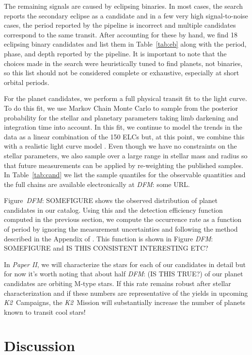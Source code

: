 \documentclass[12pt,preprint]{aastex}
\newcommand{\project}[1]{\textsl{#1}} %
\newcommand{\KT}{\project{K2}}
\newcommand{\papertwo}{\textsl{Paper II}}
\newcommand{\Tab}[1]{Table~\ref{tab:#1}}
\newcommand{\tab}[1]{\Tab{#1}}
\newcommand{\todo}[3]{{\color{#2}\emph{#1}: #3}}
\newcommand{\dfmtodo}[1]{\todo{DFM}{red}{#1}}
\begin{document}
The remaining signals are caused by eclipsing binaries.
In most cases, the search reports the secondary eclipse as a candidate and in
a few very high signal-to-noise cases, the period reported by the pipeline is
incorrect and multiple candidates correspond to the same transit.
After accounting for these by hand, we find 18 eclipsing binary candidates
and list them in \tab{eb} along with the period, phase, and depth reported by
the pipeline.
It is important to note that the choices made in the search were
heuristically tuned to find planets, not binaries, so this list should not be
considered complete or exhaustive, especially at short orbital periods.

For the planet candidates, we perform a full physical transit fit to the light
curve.
To do this fit, we use Markov Chain Monte Carlo \citep[MCMC;][]{emcee} to
sample from the posterior probability for the stellar and planetary
parameters taking limb darkening and integration time into account.
In this fit, we continue to model the trends in the data as a linear
combination of the 150 ELCs but, at this point, we combine this with a realistic
light curve model \citet{ma, kipping-ld}.
Even though we have no constraints on the stellar parameters, we also sample
over a large range in stellar mass and radius so that future measurements can
be applied by re-weighting the published samples.
In \tab{cand} we list the sample quantiles for the observable quantities and
the full chains are available electronically at \dfmtodo{some URL}.

Figure~\dfmtodo{SOMEFIGURE} shows the observed distribution of planet
candidates in our catalog.
Using this and the detection efficiency function computed in the previous
section, we compute the occurrence rate as a function of period by ignoring
the measurement uncertainties and following the method described in the
Appendix of \citet{dfm}.
This function is shown in Figure \dfmtodo{SOMEFIGURE and IS THIS CONSISTENT
INTERESTING ETC?}

In \papertwo, we will characterize the stars for each of our candidates in
detail but for now it's worth noting that about half \dfmtodo{(IS THIS TRUE?)} of our
planet candidates are orbiting M-type stars.
If this rate remains robust after stellar characterization and if these
numbers are representative of the yields in upcoming \KT\ Campaigns, the
\KT\ Mission
will substantially increase the number of planets known to transit cool stars!


\section{Discussion}
\end{document}
